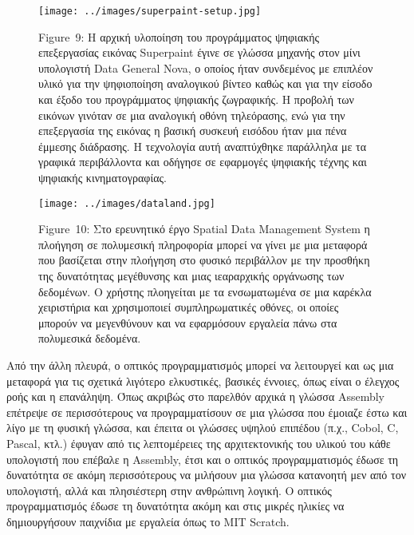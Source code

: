 \documentclass[
]{article}
\begin{document}
\leavevmode{}%
\begin{figure}
\hypertarget{fig:superpaint-setup}{%
\centering
\texttt{[image: ../images/superpaint-setup.jpg]}
\caption{Figure~9: Η αρχική υλοποίηση του προγράμματος ψηφιακής
επεξεργασίας εικόνας Superpaint έγινε σε γλώσσα μηχανής στον μίνι
υπολογιστή Data General Nova, ο οποίος ήταν συνδεμένος με επιπλέον υλικό
για την ψηφιοποίηση αναλογικού βίντεο καθώς και για την είσοδο και έξοδο
του προγράμματος ψηφιακής ζωγραφικής. Η προβολή των εικόνων γινόταν σε
μια αναλογική οθόνη τηλεόρασης, ενώ για την επεξεργασία της εικόνας η
βασική συσκευή εισόδου ήταν μια πένα έμμεσης διάδρασης. Η τεχνολογία
αυτή αναπτύχθηκε παράλληλα με τα γραφικά περιβάλλοντα και οδήγησε σε
εφαρμογές ψηφιακής τέχνης και ψηφιακής
κινηματογραφίας.}\label{fig:superpaint-setup}
}
\end{figure}

\leavevmode{}%
\begin{figure}
\hypertarget{fig:dataland}{%
\centering
\texttt{[image: ../images/dataland.jpg]}
\caption{Figure~10: Στο ερευνητικό έργο Spatial Data Management System η
πλοήγηση σε πολυμεσική πληροφορία μπορεί να γίνει με μια μεταφορά που
βασίζεται στην πλοήγηση στο φυσικό περιβάλλον με την προσθήκη της
δυνατότητας μεγέθυνσης και μιας ιεαραρχικής οργάνωσης των δεδομένων. Ο
χρήστης πλοηγείται με τα ενσωματωμένα σε μια καρέκλα χειριστήρια και
χρησιμοποιεί συμπληρωματικές οθόνες, οι οποίες μπορούν να μεγενθύνουν
και να εφαρμόσουν εργαλεία πάνω στα πολυμεσικά
δεδομένα.}\label{fig:dataland}
}
\end{figure}

Από την άλλη πλευρά, ο οπτικός προγραμματισμός μπορεί να λειτουργεί και
ως μια μεταφορά για τις σχετικά λιγότερο ελκυστικές, βασικές έννοιες,
όπως είναι ο έλεγχος ροής και η επανάληψη. Όπως ακριβώς στο παρελθόν
αρχικά η γλώσσα Assembly επέτρεψε σε περισσότερους να προγραμματίσουν σε
μια γλώσσα που έμοιαζε έστω και λίγο με τη φυσική γλώσσα, και έπειτα οι
γλώσσες υψηλού επιπέδου (π.χ., Cobol, C, Pascal, κτλ.) έφυγαν από τις
λεπτομέρειες της αρχιτεκτονικής του υλικού του κάθε υπολογιστή που
επέβαλε η Assembly, έτσι και ο οπτικός προγραμματισμός έδωσε τη
δυνατότητα σε ακόμη περισσότερους να μιλήσουν μια γλώσσα κατανοητή μεν
από τον υπολογιστή, αλλά και πλησιέστερη στην ανθρώπινη λογική. Ο
οπτικός προγραμματισμός έδωσε τη δυνατότητα ακόμη και στις μικρές
ηλικίες να δημιουργήσουν παιχνίδια με εργαλεία όπως το MIT Scratch.
\end{document}
